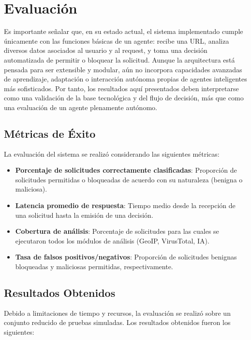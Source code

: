 \section{Evaluación}

Es importante señalar que, en su estado actual, el sistema implementado cumple únicamente con las funciones básicas de un agente: recibe una URL, analiza diversos datos asociados al usuario y al request, y toma una decisión automatizada de permitir o bloquear la solicitud. Aunque la arquitectura está pensada para ser extensible y modular, aún no incorpora capacidades avanzadas de aprendizaje, adaptación o interacción autónoma propias de agentes inteligentes más sofisticados. Por tanto, los resultados aquí presentados deben interpretarse como una validación de la base tecnológica y del flujo de decisión, más que como una evaluación de un agente plenamente autónomo.

\subsection{Métricas de Éxito}

La evaluación del sistema se realizó considerando las siguientes métricas:

\begin{itemize}
    \item \textbf{Porcentaje de solicitudes correctamente clasificadas}: Proporción de solicitudes permitidas o bloqueadas de acuerdo con su naturaleza (benigna o maliciosa).
    \item \textbf{Latencia promedio de respuesta}: Tiempo medio desde la recepción de una solicitud hasta la emisión de una decisión.
    \item \textbf{Cobertura de análisis}: Porcentaje de solicitudes para las cuales se ejecutaron todos los módulos de análisis (GeoIP, VirusTotal, IA).
    \item \textbf{Tasa de falsos positivos/negativos}: Proporción de solicitudes benignas bloqueadas y maliciosas permitidas, respectivamente.
\end{itemize}

\subsection{Resultados Obtenidos}

Debido a limitaciones de tiempo y recursos, la evaluación se realizó sobre un conjunto reducido de pruebas simuladas. Los resultados obtenidos fueron los siguientes:

